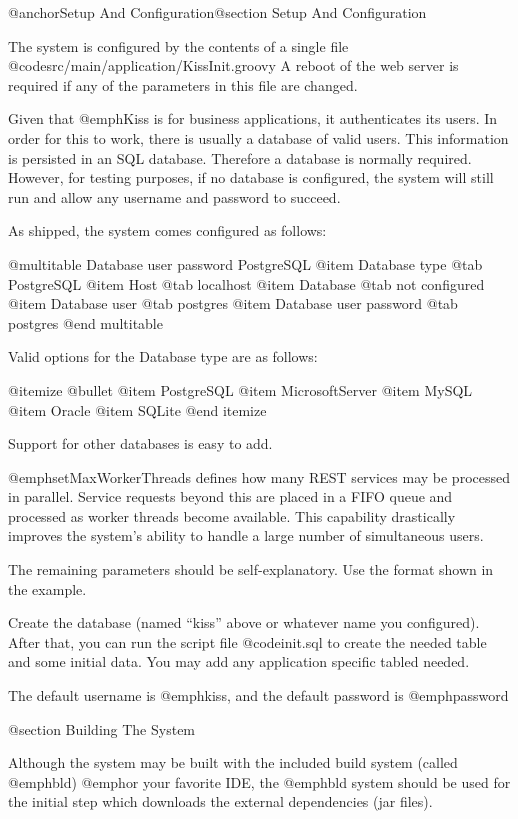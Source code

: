 @anchor{Setup And Configuration}@section Setup And Configuration

The system is configured by the contents of a single file
@code{src/main/application/KissInit.groovy} A reboot of the web server
is required if any of the parameters in this file are changed.

Given that @emph{Kiss} is for business applications, it authenticates its
users.  In order for this to work, there is usually a database of valid
users.  This information is persisted in an SQL database.  Therefore a
database is normally required.  However, for testing purposes, if no
database is configured, the system will still run and allow any
username and password to succeed.

As shipped, the system comes configured as follows:

@multitable {Database user password} {PostgreSQL} 
@item Database type
@tab PostgreSQL
@item Host
@tab localhost
@item Database
@tab not configured
@item Database user
@tab postgres
@item Database user password
@tab postgres
@end multitable

Valid options for the Database type are as follows:

@itemize @bullet
@item
PostgreSQL
@item
MicrosoftServer
@item
MySQL
@item
Oracle
@item
SQLite
@end itemize

Support for other databases is easy to add.

@emph{setMaxWorkerThreads} defines how many REST services may be
processed in parallel.  Service requests beyond this are placed in a
FIFO queue and processed as worker threads become available.  This
capability drastically improves the system's ability to handle a large
number of simultaneous users.

The remaining parameters should be self-explanatory.  Use the format
shown in the example.

Create the database (named ``kiss'' above or whatever name you
configured).  After that, you can run the script file @code{init.sql}
to create the needed table and some initial data.  You may add any
application specific tabled needed.

The default username is @emph{kiss}, and the default password is
@emph{password}

@section Building The System

Although the system may be built with the included build system
(called @emph{bld}) @emph{or} your favorite IDE, the @emph{bld}
system should be used for the initial step which downloads the external
dependencies (jar files).

